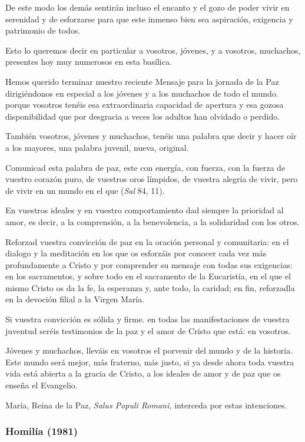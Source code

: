 De este modo los demás sentirán incluso el encanto y el gozo de poder vivir en serenidad y de esforzarse para que este inmenso bien sea aspiración, exigencia y patrimonio de todos.

Esto lo queremos decir en particular a vosotros, jóvenes, y a vosotros, muchachos, presentes hoy muy numerosos en esta basílica.

Hemos querido terminar nuestro reciente Mensaje para la jornada de la Paz dirigiéndonos en especial a los jóvenes y a los muchachos de todo el mundo. porque vosotros tenéis esa extraordinaria capacidad de apertura y esa gozosa disponibilidad que por desgracia a veces los adultos han olvidado o perdido.

También vosotros, jóvenes y muchachos, tenéis una palabra que decir y hacer oír a los mayores, una palabra juvenil, nueva, original.

Comunicad esta palabra de paz, este  con energía, con fuerza, con la fuerza de vuestro corazón puro, de vuestros oros límpidos, de vuestra alegría de vivir, pero de vivir en un mundo en el que  (\emph{Sal} 84, 11).

En vuestros ideales y en vuestro comportamiento dad siempre la prioridad al amor, es decir, a la comprensión, a la benevolencia, a la solidaridad con los otros.

Reforzad vuestra convicción de paz en la oración personal y comunitaria: en el dialogo y la meditación en los que os esforzáis por conocer cada vez más profundamente a Cristo y por comprender su mensaje con todas sus exigencias: en los sacramentos, y sobre todo en el sacramento de la Eucaristía, en el que el mismo Cristo os da la fe, la esperanza y, ante todo, la caridad; en fin, reforzadla en la devoción filial a la Virgen María.

Si vuestra convicción es sólida y firme. en todas las manifestaciones de vuestra juventud seréis testimonios de la paz y el amor de Cristo que está: en vosotros.

Jóvenes y muchachos, lleváis en vosotros el porvenir del mundo y de la historia. Este mundo será mejor, más fraterno, más justo, si ya desde ahora toda vuestra vida está abierta a la gracia de Cristo, a los ideales de amor y de paz que os enseña el Evangelio.

María, Reina de la Paz, \emph{Salus Populi Romani,} interceda por estas intenciones.

\subsubsection{Homilía (1981)}

